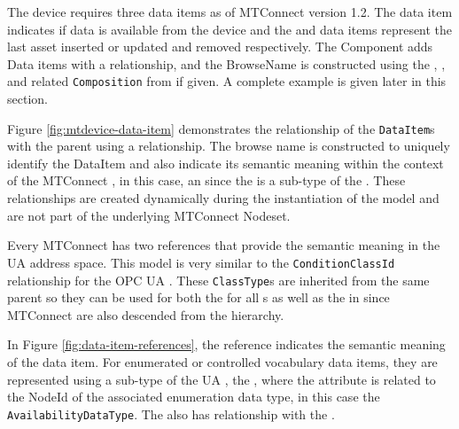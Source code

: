 The device requires three data items as of MTConnect version 1.2. The  data item indicates if data is available from the device and the  and  data items represent the last asset inserted or updated and removed respectively. The Component adds Data items with a  relationship, and the BrowseName is constructed using the , , and related \texttt{Composition} from  if given. A complete example is given later in this section.



Figure \ref{fig:mtdevice-data-item} demonstrates the relationship of the \texttt{Data\-Item}s with the parent  using a  relationship. The browse name is constructed to uniquely identify the DataItem and also indicate its semantic meaning within the context of the MTConnect , in this case, an  since the  is a sub-type of the . These relationships are created dynamically during the instantiation of the model and are not part of the underlying MTConnect Nodeset.

Every MTConnect  has two references that provide the semantic meaning in the UA address space. This model is very similar to the \texttt{Condition\-Class\-Id} relationship for the OPC UA . These \texttt{Class\-Type}s are inherited from the same parent so they can be used for both the  for all s as well as the  in  since MTConnect  are also descended from the  hierarchy.



In Figure \ref{fig:data-item-references}, the  reference indicates the semantic meaning of the data item. For enumerated or controlled vocabulary data items, they are represented using a sub-type of the UA , the , where the  attribute is related to the NodeId of the associated enumeration data type, in this case the \texttt{Availability\-Data\-Type}. The  also has  relationship with the  .

